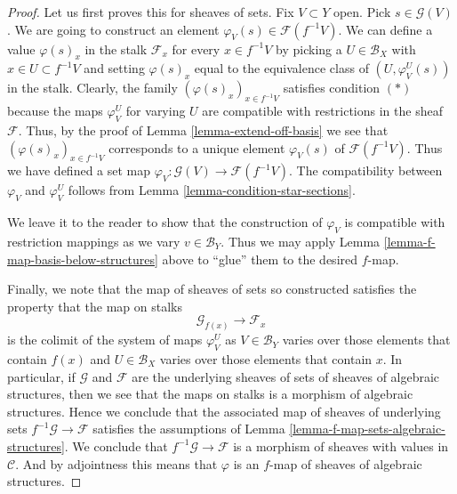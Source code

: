 \begin{proof}
Let us first proves this for sheaves of sets.
Fix $V \subset Y$ open. Pick $s \in \mathcal{G}(V)$.
We are going to construct an element
$\varphi_V(s) \in \mathcal{F}(f^{-1}V)$.
We can define a value $\varphi(s)_x$ in the stalk $\mathcal{F}_x$
for every $x \in f^{-1}V$ by picking a $U \in \mathcal{B}_X$
with $x \in U \subset f^{-1}V$ and setting $\varphi(s)_x$
equal to the equivalence class of $(U, \varphi_V^U(s))$
in the stalk. Clearly, the family $(\varphi(s)_x)_{x \in f^{-1}V}$
satisfies condition $(*)$ because the maps $\varphi_V^U$
for varying $U$
are compatible with restrictions in the sheaf $\mathcal{F}$.
Thus, by the proof of Lemma \ref{lemma-extend-off-basis}
we see that $(\varphi(s)_x)_{x \in f^{-1}V}$ corresponds
to a unique element $\varphi_V(s)$ of $\mathcal{F}(f^{-1}V)$.
Thus we have defined a set map
$\varphi_V : \mathcal{G}(V) \to \mathcal{F}(f^{-1}V)$.
The compatibility between $\varphi_V$ and $\varphi_V^U$
follows from Lemma \ref{lemma-condition-star-sections}.

\medskip\noindent
We leave it to the reader to show that the construction
of $\varphi_V$ is compatible with restriction mappings as we vary
$v \in \mathcal{B}_Y$. Thus we may apply Lemma
\ref{lemma-f-map-basis-below-structures} above to
``glue'' them to the desired $f$-map.

\medskip\noindent
Finally, we note that the map of sheaves of sets so constructed
satisfies the property that the map on stalks
$$
\mathcal{G}_{f(x)} \longrightarrow \mathcal{F}_x
$$
is the colimit of the system of maps $\varphi_V^U$ as
$V \in \mathcal{B}_Y$ varies over those elements that
contain $f(x)$ and $U \in \mathcal{B}_X$ varies over those elements that
contain $x$. In particular, if $\mathcal{G}$ and $\mathcal{F}$
are the underlying sheaves of sets of sheaves of algebraic structures,
then we see that the maps on stalks is a morphism of algebraic
structures. Hence we conclude that the associated map of
sheaves of underlying sets $f^{-1}\mathcal{G} \to \mathcal{F}$
satisfies the assumptions of
Lemma \ref{lemma-f-map-sets-algebraic-structures}.
We conclude that $f^{-1}\mathcal{G} \to \mathcal{F}$
is a morphism of sheaves with values in $\mathcal{C}$.
And by adjointness this means that $\varphi$ is
an $f$-map of sheaves of algebraic structures.
\end{proof}

